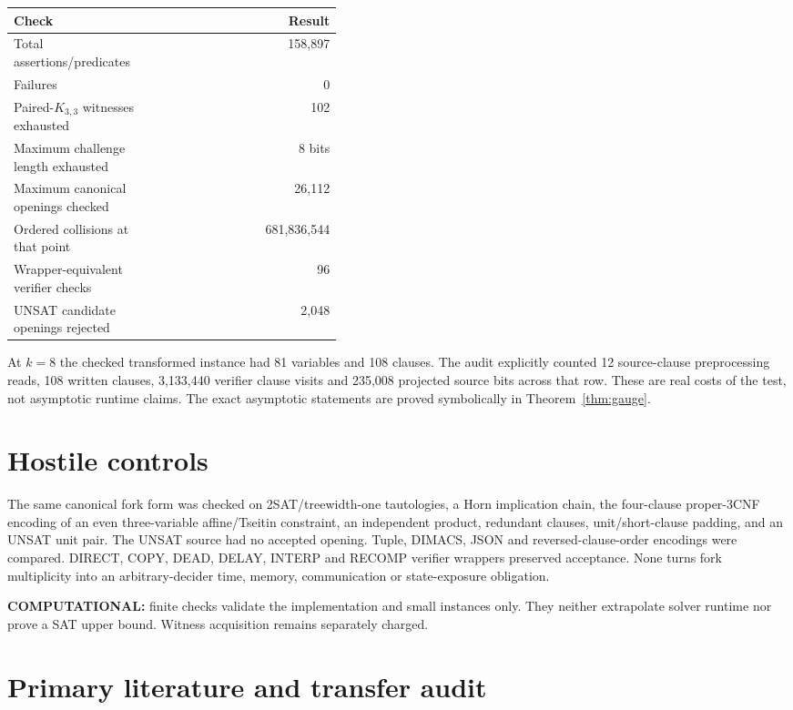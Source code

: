 \documentclass[11pt]{article}
\begin{document}
\begin{center}
\begin{tabular}{@{}p{0.42\linewidth}r@{}}
\toprule
Check & Result\\
\midrule
Total assertions/predicates & 158,897\\
Failures & 0\\
Paired-$K_{3,3}$ witnesses exhausted & 102\\
Maximum challenge length exhausted & 8 bits\\
Maximum canonical openings checked & 26,112\\
Ordered collisions at that point & 681,836,544\\
Wrapper-equivalent verifier checks & 96\\
UNSAT candidate openings rejected & 2,048\\
\bottomrule
\end{tabular}
\end{center}

At $k=8$ the checked transformed instance had 81 variables and 108 clauses.
The audit explicitly counted 12 source-clause preprocessing reads, 108 written
clauses, 3,133,440 verifier clause visits and 235,008 projected source bits
across that row.  These are real costs of the test, not asymptotic runtime
claims.  The exact asymptotic statements are proved symbolically in
Theorem~\ref{thm:gauge}.

\section{Hostile controls}

The same canonical fork form was checked on 2SAT/treewidth-one tautologies, a
Horn implication chain, the four-clause proper-3CNF encoding of an even
three-variable affine/Tseitin constraint, an independent product, redundant
clauses, unit/short-clause padding, and an UNSAT unit pair.  The UNSAT source
had no accepted opening.  Tuple, DIMACS, JSON and reversed-clause-order
encodings were compared.  DIRECT, COPY, DEAD, DELAY, INTERP and RECOMP
verifier wrappers preserved acceptance.  None turns fork multiplicity into an
arbitrary-decider time, memory, communication or state-exposure obligation.

\textbf{COMPUTATIONAL:} finite checks validate the implementation and small
instances only.  They neither extrapolate solver runtime nor prove a SAT
upper bound.  Witness acquisition remains separately charged.

\section{Primary literature and transfer audit}
\end{document}
